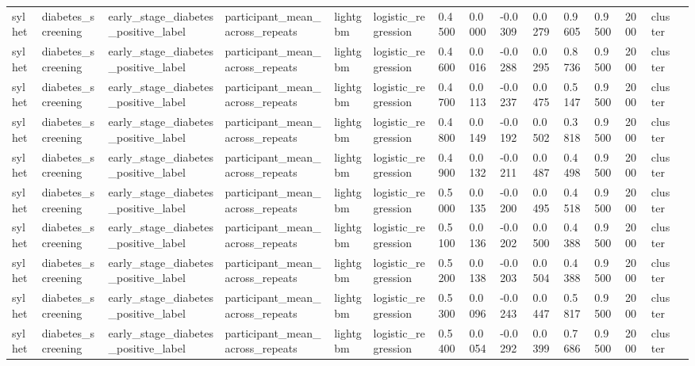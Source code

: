 \begin{tabular}{lllllllllllllll}
sylhet & diabetes\_screening & early\_stage\_diabetes\_positive\_label & participant\_mean\_across\_repeats & lightgbm & logistic\_regression & 0.4500 & 0.0000 & -0.0309 & 0.0279 & 0.9605 & 0.9500 & 2000 & cluster &  \\
sylhet & diabetes\_screening & early\_stage\_diabetes\_positive\_label & participant\_mean\_across\_repeats & lightgbm & logistic\_regression & 0.4600 & 0.0016 & -0.0288 & 0.0295 & 0.8736 & 0.9500 & 2000 & cluster &  \\
sylhet & diabetes\_screening & early\_stage\_diabetes\_positive\_label & participant\_mean\_across\_repeats & lightgbm & logistic\_regression & 0.4700 & 0.0113 & -0.0237 & 0.0475 & 0.5147 & 0.9500 & 2000 & cluster &  \\
sylhet & diabetes\_screening & early\_stage\_diabetes\_positive\_label & participant\_mean\_across\_repeats & lightgbm & logistic\_regression & 0.4800 & 0.0149 & -0.0192 & 0.0502 & 0.3818 & 0.9500 & 2000 & cluster &  \\
sylhet & diabetes\_screening & early\_stage\_diabetes\_positive\_label & participant\_mean\_across\_repeats & lightgbm & logistic\_regression & 0.4900 & 0.0132 & -0.0211 & 0.0487 & 0.4498 & 0.9500 & 2000 & cluster &  \\
sylhet & diabetes\_screening & early\_stage\_diabetes\_positive\_label & participant\_mean\_across\_repeats & lightgbm & logistic\_regression & 0.5000 & 0.0135 & -0.0200 & 0.0495 & 0.4518 & 0.9500 & 2000 & cluster &  \\
sylhet & diabetes\_screening & early\_stage\_diabetes\_positive\_label & participant\_mean\_across\_repeats & lightgbm & logistic\_regression & 0.5100 & 0.0136 & -0.0202 & 0.0500 & 0.4388 & 0.9500 & 2000 & cluster &  \\
sylhet & diabetes\_screening & early\_stage\_diabetes\_positive\_label & participant\_mean\_across\_repeats & lightgbm & logistic\_regression & 0.5200 & 0.0138 & -0.0203 & 0.0504 & 0.4388 & 0.9500 & 2000 & cluster &  \\
sylhet & diabetes\_screening & early\_stage\_diabetes\_positive\_label & participant\_mean\_across\_repeats & lightgbm & logistic\_regression & 0.5300 & 0.0096 & -0.0243 & 0.0447 & 0.5817 & 0.9500 & 2000 & cluster &  \\
sylhet & diabetes\_screening & early\_stage\_diabetes\_positive\_label & participant\_mean\_across\_repeats & lightgbm & logistic\_regression & 0.5400 & 0.0054 & -0.0292 & 0.0399 & 0.7686 & 0.9500 & 2000 & cluster &  \\

\end{tabular}
